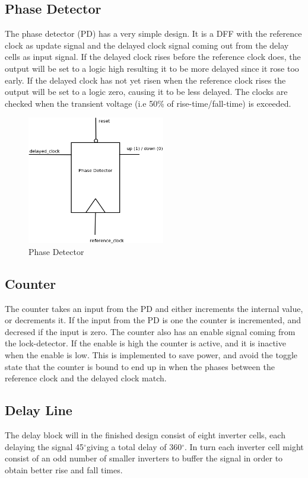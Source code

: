 \documentclass[a4paper,12pt]{article} \usepackage{graphicx}
\newcommand{\degree}{\ensuremath{^\circ}}
\begin{document}
\subsection{Phase Detector}
The phase detector (PD) has a very simple design. It is a DFF with the
reference clock as update signal and the delayed clock signal coming out from the delay cells as input signal. If the delayed clock rises before
the reference clock does, the output will be set to a logic high resulting it to 
be more delayed since it rose too early. If the delayed clock has not yet risen 
when the reference clock rises the output will be set to a logic zero, causing 
it to be less delayed. The clocks are checked when the transient voltage (i.e 50\% 
of rise-time/fall-time) is exceeded.

\begin{figure}[h!b]
        \centering
        \includegraphics[width=60mm]{../Bilder/PD_dia.png}
        \caption{Phase Detector}
        \label{fig:phase_det}
\end{figure}
 
\subsection{Counter}
The counter takes an input from the PD and either increments
the internal value, or decrements it. If the input from the PD is one the
counter is incremented, and decresed if the input is zero. The counter also has
an enable signal coming from the lock-detector. If the enable is high the counter
is active, and it is inactive when the enable is low. This is implemented to 
save power, and avoid the toggle state that the counter is bound to end up in when
the phases between the reference clock and the delayed clock match.


\subsection{Delay Line}
The delay block will in the finished design consist of eight inverter cells,
each delaying the signal 45\degree giving a total delay of 360\degree. In turn
each inverter cell might consist of an odd number of smaller inverters to buffer
the signal in order to obtain better rise and fall times.
\end{document}
